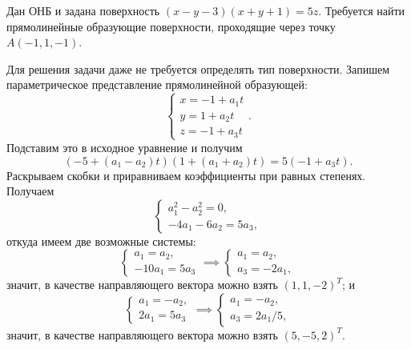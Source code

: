 \begin{task}
    Дан ОНБ и задана поверхность $(x - y - 3)(x + y + 1) = 5z$. Требуется найти прямолинейные образующие поверхности, проходящие через точку $A(-1, 1, -1)$.
\end{task}

Для решения задачи даже не требуется определять тип поверхности. Запишем параметрическое представление прямолинейной образующей:
\begin{equation*}
    \begin{cases}
        x = -1 + a_1 t \\
        y = 1 + a_2 t\\
        z = -1 + a_3 t
    \end{cases}.
\end{equation*}
Подставим это в исходное уравнение и получим
\begin{equation*}
    (-5 + (a_1 - a_2)t)(1 + (a_1 + a_2)t) = 5(- 1 + a_3t).
\end{equation*}
Раскрываем скобки и приравниваем коэффициенты при равных степенях. Получаем
\begin{equation*}
    \begin{cases}
        a_1^2 - a_2^2 = 0, \\ -4a_1 - 6a_2 = 5a_3,
    \end{cases}
\end{equation*}
откуда имеем две возможные системы:
\begin{equation*}
    \begin{cases}
        a_1 = a_2, \\ -10a_1 = 5a_3
    \end{cases} \implies \begin{cases}
        a_1 = a_2, \\ a_3 = -2a_1,
    \end{cases}
\end{equation*}
значит, в качестве направляющего вектора можно взять $(1, 1, -2)^T$;
и
\begin{equation*}
    \begin{cases}
        a_1 = -a_2, \\ 2a_1 = 5a_3
    \end{cases} \implies
    \begin{cases}
        a_1 = -a_2, \\ a_3 = 2a_1/5,
    \end{cases}
\end{equation*}
значит, в качестве направляющего вектора можно взять $(5, -5, 2)^T$.

